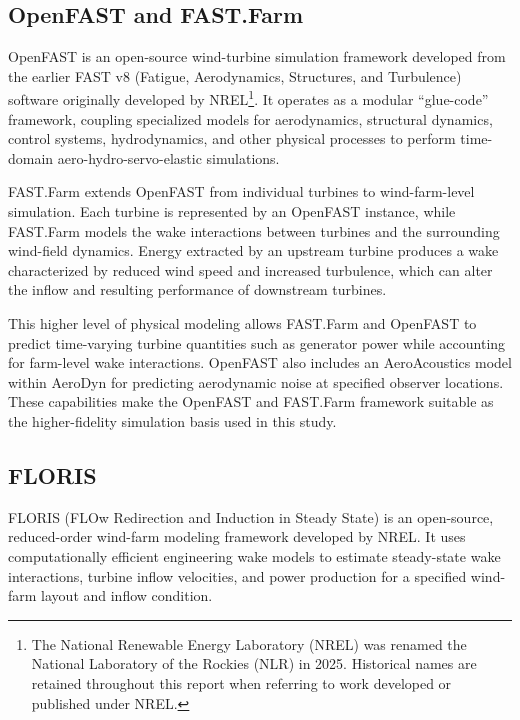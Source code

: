 \documentclass[11pt]{article}
\begin{document}
\subsection{OpenFAST and FAST.Farm}

OpenFAST is an open-source wind-turbine simulation framework developed from the earlier FAST v8 (Fatigue, Aerodynamics, Structures, and Turbulence) software originally developed by NREL\footnote{The National Renewable Energy Laboratory (NREL) was renamed the National Laboratory of the Rockies (NLR) in 2025. Historical names are retained throughout this report when referring to work developed or published under NREL.}. It operates as a modular ``glue-code'' framework, coupling specialized models for aerodynamics, structural dynamics, control systems, hydrodynamics, and other physical processes to perform time-domain aero-hydro-servo-elastic simulations.

FAST.Farm extends OpenFAST from individual turbines to wind-farm-level simulation. Each turbine is represented by an OpenFAST instance, while FAST.Farm models the wake interactions between turbines and the surrounding wind-field dynamics. Energy extracted by an upstream turbine produces a wake characterized by reduced wind speed and increased turbulence, which can alter the inflow and resulting performance of downstream turbines.

This higher level of physical modeling allows FAST.Farm and OpenFAST to predict time-varying turbine quantities such as generator power while accounting for farm-level wake interactions. OpenFAST also includes an AeroAcoustics model within AeroDyn for predicting aerodynamic noise at specified observer locations. These capabilities make the OpenFAST and FAST.Farm framework suitable as the higher-fidelity simulation basis used in this study.



\subsection{FLORIS}

FLORIS (FLOw Redirection and Induction in Steady State) is an open-source, reduced-order wind-farm modeling framework developed by NREL. It uses computationally efficient engineering wake models to estimate steady-state wake interactions, turbine inflow velocities, and power production for a specified wind-farm layout and inflow condition.
\end{document}
